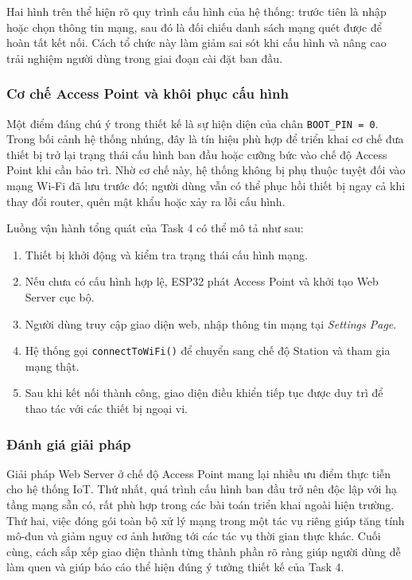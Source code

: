 Hai hình trên thể hiện rõ quy trình cấu hình của hệ thống: trước tiên là nhập hoặc chọn thông tin mạng, sau đó là đối chiếu danh sách mạng quét được để hoàn tất kết nối. Cách tổ chức này làm giảm sai sót khi cấu hình và nâng cao trải nghiệm người dùng trong giai đoạn cài đặt ban đầu.

\subsubsection{Cơ chế Access Point và khôi phục cấu hình}
Một điểm đáng chú ý trong thiết kế là sự hiện diện của chân \texttt{BOOT\_PIN = 0}. Trong bối cảnh hệ thống nhúng, đây là tín hiệu phù hợp để triển khai cơ chế đưa thiết bị trở lại trạng thái cấu hình ban đầu hoặc cưỡng bức vào chế độ Access Point khi cần bảo trì. Nhờ cơ chế này, hệ thống không bị phụ thuộc tuyệt đối vào mạng Wi-Fi đã lưu trước đó; người dùng vẫn có thể phục hồi thiết bị ngay cả khi thay đổi router, quên mật khẩu hoặc xảy ra lỗi cấu hình.

Luồng vận hành tổng quát của Task 4 có thể mô tả như sau:
\begin{enumerate}
    \item Thiết bị khởi động và kiểm tra trạng thái cấu hình mạng.
    \item Nếu chưa có cấu hình hợp lệ, ESP32 phát Access Point và khởi tạo Web Server cục bộ.
    \item Người dùng truy cập giao diện web, nhập thông tin mạng tại \textit{Settings Page}.
    \item Hệ thống gọi \texttt{connectToWiFi()} để chuyển sang chế độ Station và tham gia mạng thật.
    \item Sau khi kết nối thành công, giao diện điều khiển tiếp tục được duy trì để thao tác với các thiết bị ngoại vi.
\end{enumerate}

\subsubsection{Đánh giá giải pháp}
Giải pháp Web Server ở chế độ Access Point mang lại nhiều ưu điểm thực tiễn cho hệ thống IoT. Thứ nhất, quá trình cấu hình ban đầu trở nên độc lập với hạ tầng mạng sẵn có, rất phù hợp trong các bài toán triển khai ngoài hiện trường. Thứ hai, việc đóng gói toàn bộ xử lý mạng trong một tác vụ riêng giúp tăng tính mô-đun và giảm nguy cơ ảnh hưởng tới các tác vụ thời gian thực khác. Cuối cùng, cách sắp xếp giao diện thành từng thành phần rõ ràng giúp người dùng dễ làm quen và giúp báo cáo thể hiện đúng ý tưởng thiết kế của Task 4.